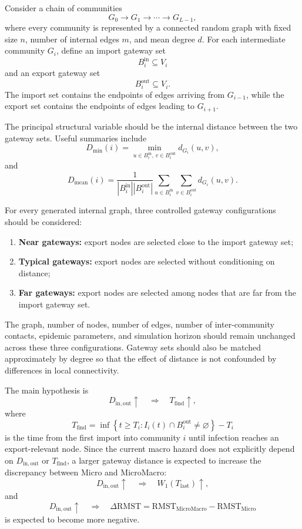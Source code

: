 \documentclass[12pt,a4paper]{article}
\begin{document}
Consider a chain of communities
\[
G_0 \rightarrow G_1 \rightarrow \cdots \rightarrow G_{L-1},
\]
where every community is represented by a connected random graph with fixed size \(n\), number of internal edges \(m\), and mean degree \(d\). For each intermediate community \(G_i\), define an import gateway set
\[
B^{\mathrm{in}}_i \subseteq V_i
\]
and an export gateway set
\[
B^{\mathrm{out}}_i \subseteq V_i.
\]
The import set contains the endpoints of edges arriving from \(G_{i-1}\), while the export set contains the endpoints of edges leading to \(G_{i+1}\).

The principal structural variable should be the internal distance between the two gateway sets. Useful summaries include
\[
D_{\min}(i)
=
\min_{u\in B^{\mathrm{in}}_i,\,
      v\in B^{\mathrm{out}}_i}
d_{G_i}(u,v),
\]
and
\[
D_{\mathrm{mean}}(i)
=
\frac{1}
{|B^{\mathrm{in}}_i||B^{\mathrm{out}}_i|}
\sum_{u\in B^{\mathrm{in}}_i}
\sum_{v\in B^{\mathrm{out}}_i}
d_{G_i}(u,v).
\]

For every generated internal graph, three controlled gateway configurations should be considered:
\begin{enumerate}
    \item \textbf{Near gateways:} export nodes are selected close to the import gateway set;
    \item \textbf{Typical gateways:} export nodes are selected without conditioning on distance;
    \item \textbf{Far gateways:} export nodes are selected among nodes that are far from the import gateway set.
\end{enumerate}

The graph, number of nodes, number of edges, number of inter-community contacts, epidemic parameters, and simulation horizon should remain unchanged across these three configurations. Gateway sets should also be matched approximately by degree so that the effect of distance is not confounded by differences in local connectivity.

The main hypothesis is
\[
D_{\mathrm{in,out}}\uparrow
\quad\Longrightarrow\quad
T_{\mathrm{find}}\uparrow,
\]
where
\[
T_{\mathrm{find}}
=
\inf\left\{
t \geq T_i :
I_i(t)\cap B^{\mathrm{out}}_i \neq \varnothing
\right\}
-
T_i
\]
is the time from the first import into community \(i\) until infection reaches an export-relevant node. Since the current macro hazard does not explicitly depend on \(D_{\mathrm{in,out}}\) or \(T_{\mathrm{find}}\), a larger gateway distance is expected to increase the discrepancy between Micro and MicroMacro:
\[
D_{\mathrm{in,out}}\uparrow
\quad\Longrightarrow\quad
W_1(T_{\mathrm{last}})\uparrow,
\]
and
\[
D_{\mathrm{in,out}}\uparrow
\quad\Longrightarrow\quad
\Delta\mathrm{RMST}
=
\mathrm{RMST}_{\mathrm{MicroMacro}}
-
\mathrm{RMST}_{\mathrm{Micro}}
\]
is expected to become more negative.
\end{document}
